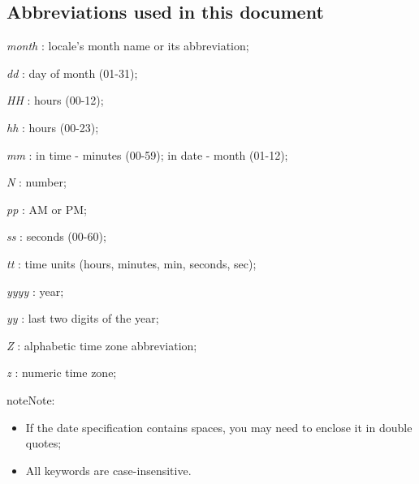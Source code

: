 \documentclass[letterpaper,10pt,english]{sphinxmanual}
\begin{document}
\subsection{Abbreviations used in this document}
\label{basic/date_format:abbreviation}\label{basic/date_format:abbreviations-used-in-this-document}
\begin{DUlineblock}{0em}
\item[] \emph{month}  : locale’s month name or its abbreviation;
\item[] \emph{dd}   : day of month (01-31);
\item[] \emph{HH}   : hours (00-12);
\item[] \emph{hh}   : hours (00-23);
\item[] \emph{mm}   : in time - minutes (00-59); in date - month (01-12);
\item[] \emph{N}    : number;
\item[] \emph{pp}   : AM or PM;
\item[] \emph{ss}   : seconds  (00-60);
\item[] \emph{tt}   : time units (hours, minutes, min, seconds, sec);
\item[] \emph{yyyy} : year;
\item[] \emph{yy}   : last two digits of the year;
\item[] \emph{Z}    : alphabetic time zone abbreviation;
\item[] \emph{z}    : numeric time zone;
\end{DUlineblock}

\begin{notice}{note}{Note:}\begin{itemize}
\item {} 
If the date specification contains spaces, you may need to
enclose it in double quotes;

\item {} 
All keywords are case-insensitive.

\end{itemize}
\end{notice}



\renewcommand{\indexname}{Index}
\printindex
\end{document}
